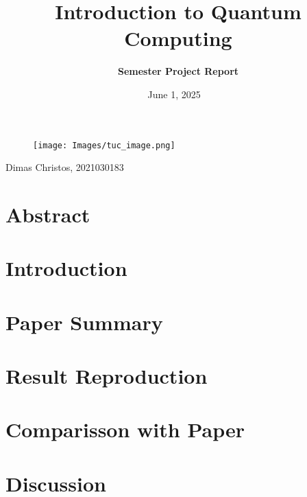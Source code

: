 \documentclass[12pt]{article}
\title{\textbf{Introduction to Quantum Computing}}
\author{\textbf{Semester Project Report}}
\date{June 1, 2025 \vspace{2em}~\vspace{2em}}
\begin{document}
\lstset{language=Python}

\begin{figure}[t]
    \centering
    \texttt{[image: Images/tuc\_image.png]}
\end{figure}

\maketitle

\begin{center}
    \vspace{8cm}
    
    Dimas Christos, 2021030183 
    
\end{center}

\newpage


\tableofcontents
\newpage

\section*{Abstract}


\section*{Introduction}


\section*{Paper Summary}


\section*{Result Reproduction}


\section*{Comparisson with Paper}


\section*{Discussion}

\end{document}
